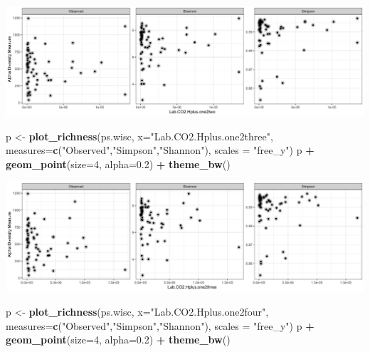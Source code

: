 \documentclass[]{article}
\newenvironment{Shaded}{\begin{snugshade}}{\end{snugshade}}
\newcommand{\DataTypeTok}[1]{\textcolor[rgb]{0.13,0.29,0.53}{#1}}
\newcommand{\DecValTok}[1]{\textcolor[rgb]{0.00,0.00,0.81}{#1}}
\newcommand{\FloatTok}[1]{\textcolor[rgb]{0.00,0.00,0.81}{#1}}
\newcommand{\KeywordTok}[1]{\textcolor[rgb]{0.13,0.29,0.53}{\textbf{#1}}}
\newcommand{\NormalTok}[1]{#1}
\newcommand{\OperatorTok}[1]{\textcolor[rgb]{0.81,0.36,0.00}{\textbf{#1}}}
\newcommand{\StringTok}[1]{\textcolor[rgb]{0.31,0.60,0.02}{#1}}
\begin{document}
\includegraphics{output-rmd/richness-ph-Lab.CO2.Hplus.one2two.wisc-1.png}

\begin{Shaded}
\begin{Highlighting}[]
\NormalTok{p <-}\StringTok{ }\KeywordTok{plot_richness}\NormalTok{(ps.wisc, }\DataTypeTok{x=}\StringTok{"Lab.CO2.Hplus.one2three"}\NormalTok{, }\DataTypeTok{measures=}\KeywordTok{c}\NormalTok{(}\StringTok{"Observed"}\NormalTok{,}\StringTok{"Simpson"}\NormalTok{,}\StringTok{"Shannon"}\NormalTok{), }\DataTypeTok{scales =} \StringTok{"free_y"}\NormalTok{)}
\NormalTok{p }\OperatorTok{+}\StringTok{ }\KeywordTok{geom_point}\NormalTok{(}\DataTypeTok{size=}\DecValTok{4}\NormalTok{, }\DataTypeTok{alpha=}\FloatTok{0.2}\NormalTok{) }\OperatorTok{+}\StringTok{ }\KeywordTok{theme_bw}\NormalTok{()}
\end{Highlighting}
\end{Shaded}

\includegraphics{output-rmd/richness-ph-Lab.CO2.Hplus.one2three.wisc-1.png}

\begin{Shaded}
\begin{Highlighting}[]
\NormalTok{p <-}\StringTok{ }\KeywordTok{plot_richness}\NormalTok{(ps.wisc, }\DataTypeTok{x=}\StringTok{"Lab.CO2.Hplus.one2four"}\NormalTok{, }\DataTypeTok{measures=}\KeywordTok{c}\NormalTok{(}\StringTok{"Observed"}\NormalTok{,}\StringTok{"Simpson"}\NormalTok{,}\StringTok{"Shannon"}\NormalTok{), }\DataTypeTok{scales =} \StringTok{"free_y"}\NormalTok{)}
\NormalTok{p }\OperatorTok{+}\StringTok{ }\KeywordTok{geom_point}\NormalTok{(}\DataTypeTok{size=}\DecValTok{4}\NormalTok{, }\DataTypeTok{alpha=}\FloatTok{0.2}\NormalTok{) }\OperatorTok{+}\StringTok{ }\KeywordTok{theme_bw}\NormalTok{()}
\end{Highlighting}
\end{Shaded}
\end{document}

